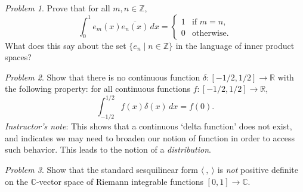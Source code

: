 \documentclass[11pt,twoside]{amsart}
\theoremstyle{plain}
\theoremstyle{remark}
\newtheorem{prob}{Problem}
\theoremstyle{definition}
\theoremstyle{definition}
\newcommand{\RR}{\mathbb{R}}
\newcommand{\ZZ}{\mathbb{Z}}
\newcommand{\CC}{\mathbb{C}}
\begin{document}

\begin{prob}
Prove that for all $m,n\in \ZZ$,
\[
  \int_0^1 e_m(x)\overline{e_n(x)}\,dx =
  \begin{cases}
    1&\text{if }m=n,\\
    0&\text{otherwise}.
  \end{cases}
\]
What does this say about the set $\{e_n\mid n\in\ZZ\}$ in the language of inner product spaces?
\end{prob}


\begin{prob}
Show that there is no continuous function $\delta\colon [-1/2,1/2]\to \RR$ with the following property: for all continuous functions $f\colon [-1/2,1/2]\to \RR$,
\[
  \int_{-1/2}^{1/2}f(x)\delta(x)\,dx = f(0).
\]
\emph{Instructor's note}: This shows that a continuous `delta function' does not exist, and indicates we may need to broaden our notion of function in order to access such behavior. This leads to the notion of a \emph{distribution}.
\end{prob}


\begin{prob}
Show that the standard sesquilinear form $\langle ~,~\rangle$ is \emph{not} positive definite on the $\CC$-vector space of Riemann integrable functions $[0,1]\to \CC$.
\end{prob}

\end{document}
